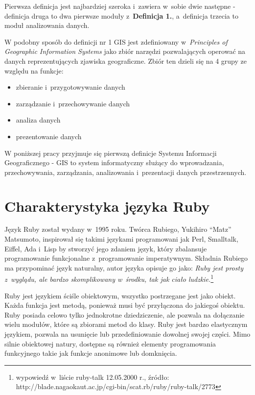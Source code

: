 \documentclass[printmode]{mgr}
\begin{document}
Pierwsza definicja jest najbardziej szeroka i~zawiera w~sobie dwie następne - definicja druga to dwa pierwsze moduły z~\textbf{Definicja 1.}, a~definicja trzecia to moduł analizowania danych.

W podobny sposób do definicji nr 1 GIS jest zdefiniowany w~\emph{Principles of Geographic Information Systems}\cite{principles_gis} jako zbiór narzędzi pozwalających operować na danych reprezentujących zjawiska geograficzne. Zbiór ten dzieli się na 4 grupy ze względu na funkcje:
  \begin{itemize}
    \item zbieranie i~przygotowywanie danych
    \item zarządzanie i~przechowywanie danych
    \item analiza danych
    \item prezentowanie danych
  \end{itemize}

W poniższej pracy przyjmuje się pierwszą definicje Systemu Informacji Geograficznego - GIS to system informatyczny służący do wprowadzania, przechowywania, zarządzania, analizowania i~prezentacji danych przestrzennych.

\section{Charakterystyka języka Ruby}
Język Ruby został wydany w~1995 roku. Twórca Rubiego, Yukihiro “Matz” Matsumoto, inspirował się takimi językami programowani jak Perl, Smalltalk, Eiffel, Ada i~Lisp by stworzyć jego zdaniem język, który zbalansuje programowanie funkcjonalne z~programowanie imperatywnym\cite{doc_ruby}. Składnia Rubiego ma przypominać język naturalny, autor języka opisuje go jako: \emph{Ruby jest prosty z~wyglądu, ale bardzo skomplikowany w~środku, tak jak ciało ludzkie.}\footnote{wypowiedź w~liście ruby-talk 12.05.2000 r., źródło: http://blade.nagaokaut.ac.jp/cgi-bin/scat.rb/ruby/ruby-talk/2773}

Ruby jest językiem ściśle obiektowym, wszystko postrzegane jest jako obiekt. Każda funkcja jest metodą, ponieważ musi być przyłączona do jakiegoś obiektu. Ruby posiada celowo tylko jednokrotne dziedziczenie, ale pozwala na dołączanie wielu modułów, które są zbiorami metod do klasy. Ruby jest bardzo elastycznym językiem, pozwala na usunięcie lub przedefiniowanie dowolnej swojej części. Mimo silnie obiektowej natury, dostępne są również elementy programowania funkcyjnego takie jak funkcje anonimowe lub domknięcia.
\end{document}
